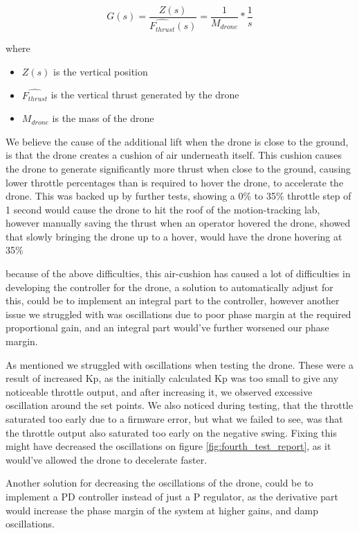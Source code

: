 \begin{equation} \label{eq:new_tf}
    G(s) = \frac{Z(s)}{\hat{F_{thrust}}(s)} = \frac{1}{M_{drone}} * \frac{1}{s}
\end{equation}

where
\begin{itemize}
    \item $Z(s)$ is the vertical position
    \item $\hat{F_{thrust}}$ is the vertical thrust generated by the drone
    \item $M_{drone}$ is the mass of the drone
\end{itemize}

We believe the cause of the additional lift when the drone is close to the ground, is that the drone creates a cushion of air underneath itself. This cushion causes the drone to generate significantly more thrust when close to the ground, causing lower throttle percentages than is required to hover the drone, to accelerate the drone. This was backed up by further tests, showing a 0\% to 35\% throttle step of 1 second would cause the drone to hit the roof of the motion-tracking lab, however manually saving the thrust when an operator hovered the drone, showed that slowly bringing the drone up to a hover, would have the drone hovering at 35\% 

because of the above difficulties, this air-cushion has caused a lot of difficulties in developing the controller for the drone, a solution to automatically adjust for this, could be to implement an integral part to the controller, however another issue we struggled with was oscillations due to poor phase margin at the required proportional gain, and an integral part would've further worsened our phase margin. 

As mentioned we struggled with oscillations when testing the drone. These were a result of increased Kp, as the initially calculated Kp was too small to give any noticeable throttle output, and after increasing it, we observed excessive oscillation around the set points. We also noticed during testing, that the throttle saturated too early due to a firmware error, but what we failed to see, was that the throttle output also saturated too early on the negative swing. Fixing this might have decreased the oscillations on figure \ref{fig:fourth_test_report}, as it would've allowed the drone to decelerate faster.

Another solution for decreasing the oscillations of the drone, could be to implement a PD controller instead of just a P regulator, as the derivative part would increase the phase margin of the system at higher gains, and damp oscillations.

